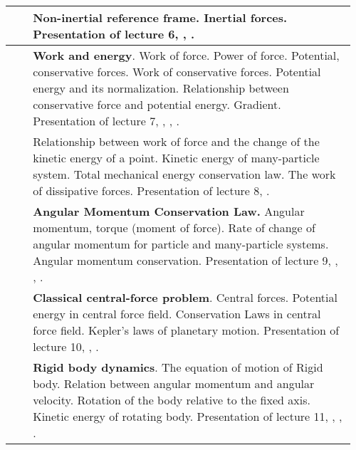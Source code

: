 \documentclass{rnp}
\begin{document}
\begin{longtable}{|>{\arraybackslash}m{0.06\linewidth}|>{\raggedright\arraybackslash}m{0.9\linewidth}|}
	\\  
	\hline
	\thead{\rownumber.} 
	& \textbf{Non-inertial reference frame.} Inertial forces.\newline
	Presentation of lecture 6, \cite[\S~2.5]{IrodovMechanics}, \cite[Chapter 4, ADVANCED TOPICS]{BerkeleyMechanics}.
	\\  
	\hline
	\thead{\rownumber.} 
	& \textbf{Work and energy}. Work of force. Power of force. Potential, conservative forces. Work of conservative forces. Potential energy and its normalization. Relationship between conservative force and potential energy. Gradient.\newline
	Presentation of lecture 7, \cite[\S~3.1 -- 3.4]{IrodovMechanics}, \cite[Chapter 5]{BerkeleyMechanics}, \cite[Chapter 7, Chapter 8]{Holyday}.
	\\  
	\hline
	\thead{\rownumber.} 
	& Relationship between work of force and the change of the kinetic energy of a point. Kinetic energy of many-particle system. Total mechanical energy conservation law. The work of dissipative forces. \newline
	Presentation of lecture 8, \cite[\S~3.5]{IrodovMechanics}.
	\\  
	\hline
	\thead{\rownumber.} 
	& \textbf{Angular Momentum Conservation Law.} Angular momentum, torque (moment of force). Rate of change of angular momentum for particle and many-particle systems. Angular momentum conservation.
	 \newline
	Presentation of lecture 9, \cite[\S~5.1 -- 5.3]{IrodovMechanics}, \cite[Chapter 6]{BerkeleyMechanics}, \cite[Sections 10-4 -- 10-8, 11-7(The Angular Momentum of a System of Particles)]{Holyday}.
	\\  
	\hline
	\thead{\rownumber.} 
	& \textbf{Classical central-force problem}. Central forces. Potential energy in central force field. Conservation Laws in central force field. Kepler's laws of planetary motion.\newline
	Presentation of lecture 10, \cite[Chapter 9]{BerkeleyMechanics}, \cite[Chapter 13]{Holyday}.
	\\  
	\hline
	\thead{\rownumber.} 
	& \textbf{Rigid body dynamics}. The equation of motion of Rigid body. Relation between angular momentum and angular velocity. Rotation of the body relative to the fixed axis. Kinetic energy of rotating body. \newline
	Presentation of lecture 11, \cite[\S~5.4]{IrodovMechanics}, \cite[Chapter 8]{BerkeleyMechanics}, \cite[Chapter 11]{Holyday}.
	\\  

\end{longtable}
\end{document}
